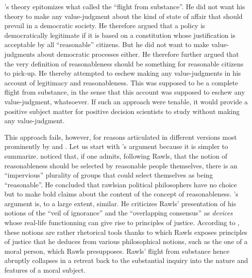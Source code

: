 \documentclass[preprint, french, english, 11pt, authoryear]{elsarticle}%
\begin{document}
\cite{rawls_political_2005}'s theory epitomizes what \cite{estlund_democratic_2009} called the ``flight from substance''. He did not want his theory to make any value-judgment about the kind of state of affair that should prevail in a democratic society. He therefore argued that a policy is democratically legitimate if it is based on a constitution whose justification is acceptable by all  ``reasonable'' citizens. But he did not want to make value-judgments about democratic processes either. He therefore further argued that the very definition of reasonableness should be something for reasonable citizens to pick-up. He thereby attempted to eschew making any value-judgments in his account of legitimacy and reasonableness. This was supposed to be a complete flight from substance, in the sense that this account was supposed to eschew any value-judgment, whatsoever. If such an approach were tenable, it would provide a positive subject matter for positive decision scientists to study without making any value-judgment.

This approach fails, however, for reasons articulated in different versions most prominently by \cite{habermas_reconciliation_1995} and \cite{estlund_democratic_2009}. Let us start with \cite{estlund_democratic_2009}'s argument because it is simpler to summarize. \cite{estlund_democratic_2009} noticed that, if one admits, following Rawls, that the notion of reasonableness should be selected by reasonable people themselves, there is an ``impervious'' plurality of groups that could select themselves as being ``reasonable''. He concluded that rawlsian political philosophers have no choice but to make bold claims about the content of the concept of reasonableness. \cite{habermas_reconciliation_1995}'s argument is, to a large extent, similar. He criticizes Rawls' presentation of his notions of the ``veil of ignorance'' and the ``overlapping consensus'' as \emph{devices} whose real-life functionning can give rise to principles of justice. According to \cite{habermas_reconciliation_1995}, these notions are rather rhetorical tools thanks to which Rawls exposes principles of justice that he deduces from various philosophical notions, such as the one of a moral person, which Rawls presupposes. Rawls' flight from substance hence abruptly collapses in a retreat back to the substantial inquiry into the nature and features of a moral subject.
\end{document}

